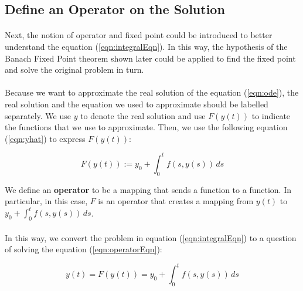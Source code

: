 \documentclass{article}
\theoremstyle{definition}
\theoremstyle{remark}
\theoremstyle{example}
\begin{document}
\subsection{Define an Operator on the Solution}\label{sec:3.2}

\paragraph{  }

Next, the notion of operator and fixed point could be introduced to better understand the equation (\ref{eqn:integralEqn}). In this way, the hypothesis of the Banach Fixed Point theorem shown later could be applied to find the fixed point and solve the original problem in turn.

\paragraph{  }

Because we want to approximate the real solution of the equation (\ref{eqn:ode}), the real solution and the equation we used to approximate should be labelled separately. We use $y$ to denote the real solution and use $F(y(t))$ to indicate the functions that we use to approximate. Then, we use the following equation (\ref{eqn:yhat}) to express $F(y(t))$:

\begin{equation}\label{eqn:yhat}
    F(y(t)) := y_0 + \int_{0}^{t}{f(s,y(s))}\,ds
\end{equation}

We define an \textbf{operator} to be a mapping that sends a function to a function. In particular, in this case, $F$ is an operator that creates a mapping from $y(t)$ to $y_0 + \int_{0}^{t}{f(s,y(s))}\,ds$.

\paragraph{  }

In this way, we convert the problem in equation (\ref{eqn:integralEqn}) to a question of solving the equation (\ref{eqn:operatorEqn}):

\begin{equation}\label{eqn:operatorEqn}
    y(t) = F(y(t)) = y_0 + \int_{0}^{t}{f(s,y(s))}\,ds
\end{equation}

\paragraph{  }
\end{document}

